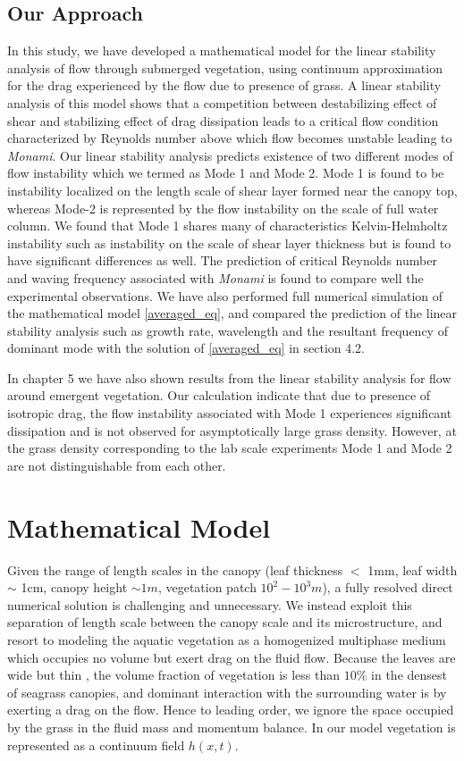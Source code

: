 \documentclass[12pt]{report}   %
\begin{document}
\section{Our Approach}
In this study, we have developed a mathematical model for the linear stability analysis of flow through submerged vegetation, using continuum approximation for the drag experienced by the flow due to presence of grass. A linear stability analysis of this model shows that a competition between destabilizing effect of shear and stabilizing effect of drag dissipation leads to a critical flow condition characterized by Reynolds number above which flow becomes unstable leading to \textit{Monami}. Our linear stability analysis predicts existence of two different modes of flow instability which we termed as Mode 1 and Mode 2. Mode 1 is found to be instability localized on the length scale of shear layer formed near the canopy top, whereas Mode-2 is represented by the flow instability on the scale of full water column. We found that Mode 1 shares many of characteristics Kelvin-Helmholtz instability such as instability on the scale of 
shear layer thickness but is found to have significant differences as well. The prediction of critical Reynolds number and waving frequency associated with \textit{Monami} is found to compare well the experimental observations. We have also performed full numerical simulation of the mathematical model \eqref{averaged_eq}, and compared the prediction of the linear stability analysis such as growth rate, wavelength and the resultant frequency of dominant mode with the solution of \eqref{averaged_eq} in section 4.2.

In chapter 5 we have also shown results from the linear stability analysis for flow around emergent vegetation. Our calculation indicate that due to presence of isotropic drag, the flow instability associated with Mode 1 experiences significant dissipation and is not observed for asymptotically large grass density. However, at the grass density corresponding to the lab scale experiments Mode 1 and Mode 2 are not distinguishable from each other. 

%
\clearpage{\pagestyle{empty}\cleardoublepage}

\chapter{Mathematical Model}
Given the range of length scales in the canopy (leaf thickness $<$ 1mm, leaf width $\sim$ 1cm, canopy height $\sim 1m$, vegetation patch $10^2-10^3 m$), a fully resolved direct numerical solution is challenging and unnecessary. We instead exploit this separation of length scale between the canopy scale and its microstructure, and resort to modeling the aquatic vegetation as a homogenized multiphase medium which occupies no volume but exert drag on the fluid flow.
Because the leaves are wide but thin , the volume fraction of vegetation is less than $10\%$ \cite{chandler96} in the densest of seagrass canopies, and dominant interaction with the surrounding water is by exerting a drag on the flow. Hence to leading order, we ignore the space occupied by the grass in the fluid mass and momentum balance. In our model vegetation is represented as a continuum field $h(x,t)$. 
\end{document}
